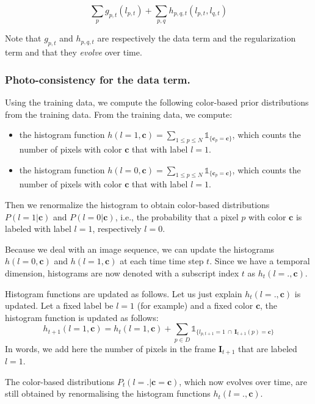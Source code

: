 \documentclass[a4paper,twoside,10pt]{article}
\begin{document}
\begin{equation}
\sum_p g_{p,t}(l_{p,t}) + \sum_{p,q} h_{p,q,t} (l_{p,t}, l_{q,t})
\end{equation}

Note that $g_{p,t}$ and $h_{p,q,t}$ are respectively the data term and the regularization term and that they \emph{evolve} over time.


\subsubsection{Photo-consistency for the data term.}
Using the training data, we compute the following color-based prior distributions from the training data. From the training data, we compute:
\begin{itemize}
\item the histogram function $h(l = 1, \mathbf{c}) = \displaystyle\sum_{1 \leq p \leq N} \mathds{1}_{\{\mathbf{c}_p = \mathbf{c}\}}$, which counts the number of pixels with color $\mathbf{c}$ that with label $l=1$.
\item the histogram function $h(l = 0, \mathbf{c}) = \displaystyle\sum_{1 \leq p \leq N} \mathds{1}_{\{\mathbf{c}_p = \mathbf{c}\}}$, which counts the number of pixels with color $\mathbf{c}$ that with label $l=1$.
\end{itemize}
Then we renormalize the histogram to obtain color-based distributions $P(l = 1 | \mathbf{c})$ and $P(l = 0 | \mathbf{c})$, i.e., the probability that a pixel $p$ with color $\mathbf{c}$ is labeled with label $l=1$, respectively $l=0$.

Because we deal with an image sequence, we can update the histograms $h(l = 0, \mathbf{c})$ and $h(l = 1, \mathbf{c})$ at each time time step $t$. Since we have a temporal dimension, histograms are now denoted with a subscript index $t$ as $h_t(l = ., \mathbf{c})$.

Histogram functions are updated as follows. Let us just explain $h_{t}(l = ., \mathbf{c})$ is updated. Let a fixed label be $l=1$ (for example) and a fixed color $\mathbf{c}$, the histogram function is updated as follows:
\begin{equation}
h_{t+1}(l = 1, \mathbf{c}) = h_t(l=1, \mathbf{c}) + \sum_{p \in D} \mathds{1}_{\{l_{p,t+1} = 1\ \cap\ \mathbf{I}_{t+1}(p) = \mathbf{c}\}}
\end{equation}
In words, we add here the number of pixels in the frame $\mathbf{I}_{t+1}$ that are labeled $l=1$.

The color-based distributions $P_t(l = . | \mathbf{c} = \mathbf{c})$, which now evolves over time, are still obtained by renormalising the histogram functions $h_{t}(l = ., \mathbf{c})$.
\end{document}
